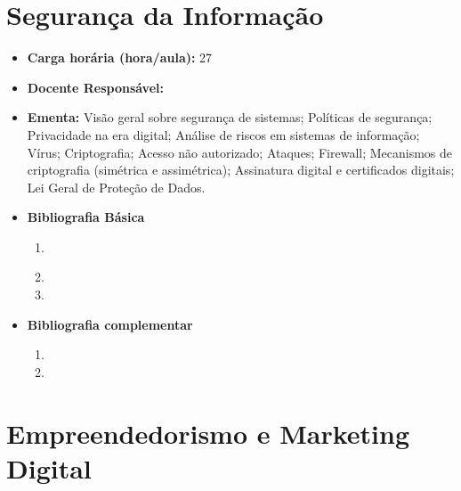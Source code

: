 \documentclass[11pt,fleqn]{book} %
\begin{document}

\newpage
\section{Segurança da Informação}\label{disc:seginfo}

\begin{itemize}
	\item \textbf{Carga horária (hora/aula):} 27
	\item \textbf{Docente Responsável:}~
	\item \textbf{Ementa:} 
	Visão geral sobre segurança de sistemas;
	Políticas de segurança; 
	Privacidade na era digital;
	Análise de riscos em sistemas de informação;
	Vírus;
	Criptografia; 
	Acesso não autorizado; 
	Ataques;
	Firewall;
	Mecanismos de criptografia (simétrica e assimétrica);
	Assinatura digital e certificados digitais;
	Lei Geral de Proteção de Dados.

	\item \textbf{Bibliografia Básica}
	\begin{enumerate}
		\item \cite{cartilha2012}
		\item 
		\item 
	\end{enumerate}
	\item \textbf{Bibliografia complementar}
	\begin{enumerate}
		\item 
		\item
	\end{enumerate} 	
\end{itemize}


\newpage
\section{Empreendedorismo e Marketing Digital}\label{disc:empmkt}
\end{document}
